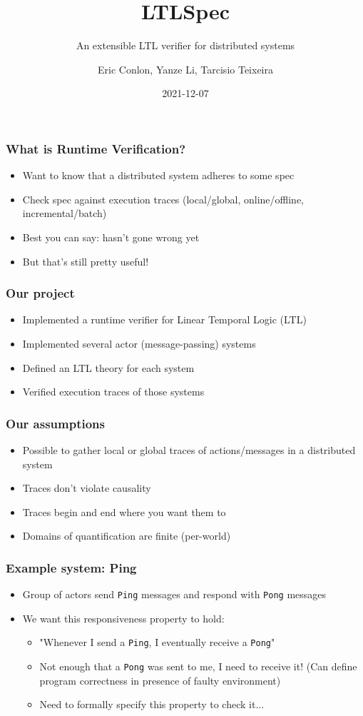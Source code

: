 \documentclass[12pt,aspectratio=169]{beamer}
\title{LTLSpec}
\subtitle{An extensible LTL verifier for distributed systems}
\author{Eric Conlon, Yanze Li, Tarcisio Teixeira}
\date{2021-12-07}
\begin{document}
\frame{\titlepage}

\begin{frame}
\frametitle{What is Runtime Verification?}
\begin{itemize}
  \item Want to know that a distributed system adheres to some spec
  \item Check spec against execution traces
  \newline (local/global, online/offline, incremental/batch)
  \item Best you can say: hasn't gone wrong yet
  \item But that's still pretty useful!
\end{itemize}
\end{frame}

\begin{frame}
\frametitle{Our project}
\begin{itemize}
  \item Implemented a runtime verifier for Linear Temporal Logic (LTL)
  \item Implemented several actor (message-passing) systems
  \item Defined an LTL theory for each system
  \item Verified execution traces of those systems
\end{itemize}
\end{frame}

\begin{frame}
\frametitle{Our assumptions}
\begin{itemize}
  \item Possible to gather local or global traces of actions/messages in a distributed system
  \item Traces don't violate causality
  \item Traces begin and end where you want them to
  \item Domains of quantification are finite (per-world)
\end{itemize}
\end{frame}

\begin{frame}
\frametitle{Example system: Ping}
\begin{itemize}
  \item Group of actors send \texttt{Ping} messages and respond with \texttt{Pong} messages
  \item We want this responsiveness property to hold:
  \begin{itemize}
    \item "Whenever I send a \texttt{Ping}, I eventually receive a \texttt{Pong}"
    \item Not enough that a \texttt{Pong} was sent to me, I need to receive it!
    \newline (Can define program correctness in presence of faulty environment)
    \item Need to formally specify this property to check it...
  \end{itemize}
\end{itemize}
\end{frame}
\end{document}
